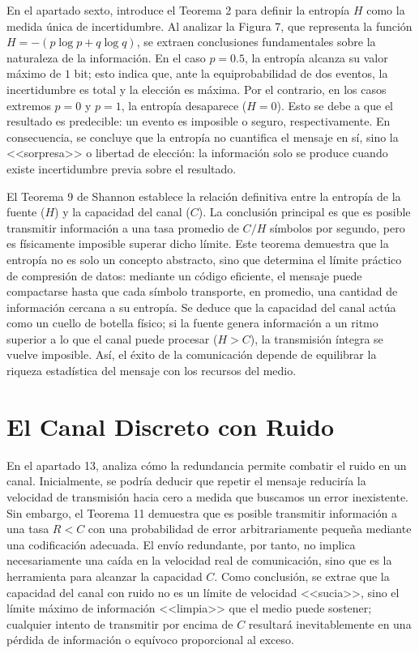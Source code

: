 \documentclass[11pt,a4paper,spanish]{book}
\begin{document}
En el apartado sexto, \cite{shannon1948} introduce el Teorema 2 para definir la entropía $H$ como la medida única de incertidumbre. Al analizar la Figura 7, que representa la función $H = -(p \log p + q \log q)$, se extraen conclusiones fundamentales sobre la naturaleza de la información. En el caso $p=0.5$, la entropía alcanza su valor máximo de $1$ bit; esto indica que, ante la equiprobabilidad de dos eventos, la incertidumbre es total y la elección es máxima. Por el contrario, en los casos extremos $p=0$ y $p=1$, la entropía desaparece ($H=0$). Esto se debe a que el resultado es predecible: un evento es imposible o seguro, respectivamente. En consecuencia, se concluye que la entropía no cuantifica el mensaje en sí, sino la <<sorpresa>> o libertad de elección: la información solo se produce cuando existe incertidumbre previa sobre el resultado.

El Teorema 9 de Shannon establece la relación definitiva entre la entropía de la fuente ($H$) y la capacidad del canal ($C$). La conclusión principal es que es posible transmitir información a una tasa promedio de $C/H$ símbolos por segundo, pero es físicamente imposible superar dicho límite. Este teorema demuestra que la entropía no es solo un concepto abstracto, sino que determina el límite práctico de compresión de datos: mediante un código eficiente, el mensaje puede compactarse hasta que cada símbolo transporte, en promedio, una cantidad de información cercana a su entropía. Se deduce que la capacidad del canal actúa como un cuello de botella físico; si la fuente genera información a un ritmo superior a lo que el canal puede procesar ($H > C$), la transmisión íntegra se vuelve imposible. Así, el éxito de la comunicación depende de equilibrar la riqueza estadística del mensaje con los recursos del medio.

\section{El Canal Discreto con Ruido}

En el apartado 13, \cite{shannon1948} analiza cómo la redundancia permite combatir el ruido en un canal. Inicialmente, se podría deducir que repetir el mensaje reduciría la velocidad de transmisión hacia cero a medida que buscamos un error inexistente. Sin embargo, el Teorema 11 demuestra que es posible transmitir información a una tasa $R < C$ con una probabilidad de error arbitrariamente pequeña mediante una codificación adecuada. El envío redundante, por tanto, no implica necesariamente una caída en la velocidad real de comunicación, sino que es la herramienta para alcanzar la capacidad $C$. Como conclusión, se extrae que la capacidad del canal con ruido no es un límite de velocidad <<sucia>>, sino el límite máximo de información <<limpia>> que el medio puede sostener; cualquier intento de transmitir por encima de $C$ resultará inevitablemente en una pérdida de información o equívoco proporcional al exceso.
\end{document}
